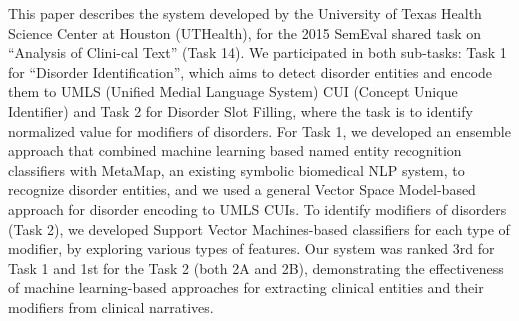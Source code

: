 This paper describes the system developed by the University of Texas Health Science Center at Houston (UTHealth), for the 2015 SemEval shared task on ``Analysis of Clini-cal Text'' (Task 14). We participated in both sub-tasks: Task 1 for ``Disorder Identification'', which aims to detect disorder entities and encode them to UMLS (Unified Medial Language System) CUI (Concept Unique Identifier) and Task 2 for Disorder Slot Filling, where the task is to identify normalized value for modifiers of disorders. For Task 1, we developed an ensemble approach that combined machine learning based named entity recognition classifiers with MetaMap, an existing symbolic biomedical NLP system, to recognize disorder entities, and we used a general Vector Space Model-based approach for disorder encoding to UMLS CUIs. To identify modifiers of disorders (Task 2), we developed Support Vector Machines-based classifiers for each type of modifier, by exploring various types of features. Our system was ranked 3rd for Task 1 and 1st for the Task 2 (both 2A and 2B), demonstrating the effectiveness of machine learning-based approaches for extracting clinical entities and their modifiers from clinical narratives.
